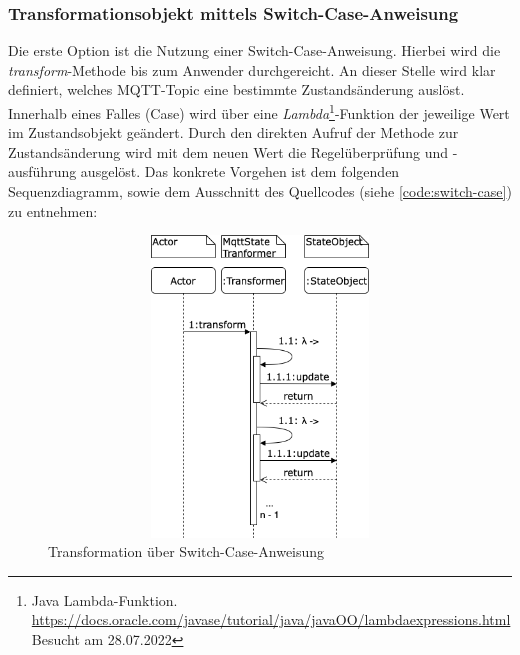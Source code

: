     \subsubsection*{Transformationsobjekt mittels Switch-Case-Anweisung}
    Die erste Option ist die Nutzung einer Switch-Case-Anweisung. Hierbei wird die \textit{transform}-Methode bis zum Anwender durchgereicht. An dieser Stelle 
    wird klar definiert, welches \acs{MQTT}-Topic eine bestimmte Zustandsänderung auslöst. Innerhalb eines Falles (Case) wird über eine 
    \textit{Lambda}\footnote{Java Lambda-Funktion. \url{https://docs.oracle.com/javase/tutorial/java/javaOO/lambdaexpressions.html} Besucht am 28.07.2022}-Funktion 
    der jeweilige Wert im Zustandsobjekt geändert. Durch den direkten Aufruf der Methode zur Zustandsänderung wird mit dem neuen Wert die Regelüberprüfung und -ausführung 
    ausgelöst. Das konkrete Vorgehen ist dem folgenden Sequenzdiagramm, sowie dem Ausschnitt des Quellcodes (siehe \ref{code:switch-case}) zu entnehmen:
    \begin{figure}[hbt!]
        \centering
        \includegraphics[width=14cm,height=8cm,keepaspectratio]{images/Transformation_old.png}
        \caption{Transformation über Switch-Case-Anweisung}
        \label{fig:sequenceTransformationOld}
    \end{figure}

